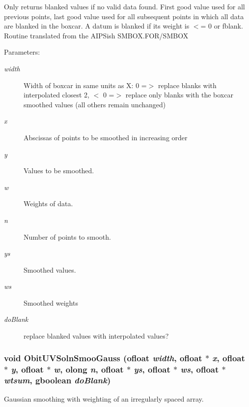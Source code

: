 Only returns blanked values if no valid data found. First good value used for all previous points, last good value used for all subsequent points in which all data are blanked in the boxcar. A datum is blanked if its weight is $<$= 0 or fblank. Routine translated from the AIPSish SMBOX.FOR/SMBOX \begin{Desc}
\item[Parameters:]
\begin{description}
\item[{\em width}]Width of boxcar in same units as X: 0 =$>$ replace blanks with interpolated closest 2, $<$ 0 =$>$ replace only blanks with the boxcar smoothed values (all others remain unchanged) \item[{\em x}]Abscissas of points to be smoothed in increasing order \item[{\em y}]Values to be smoothed. \item[{\em w}]Weights of data. \item[{\em n}]Number of points to smooth. \item[{\em ys}]Smoothed values. \item[{\em ws}]Smoothed weights \item[{\em do\-Blank}]replace blanked values with interpolated values? \end{description}
\end{Desc}
\subsubsection{\setlength{\rightskip}{0pt plus 5cm}void Obit\-UVSoln\-Smoo\-Gauss ({\bf ofloat} {\em width}, {\bf ofloat} $\ast$ {\em x}, {\bf ofloat} $\ast$ {\em y}, {\bf ofloat} $\ast$ {\em w}, {\bf olong} {\em n}, {\bf ofloat} $\ast$ {\em ys}, {\bf ofloat} $\ast$ {\em ws}, {\bf ofloat} $\ast$ {\em wtsum}, gboolean {\em do\-Blank})}\label{ObitUVSoln_8c_a33}


Gaussian smoothing with weighting of an irregularly spaced array. 

